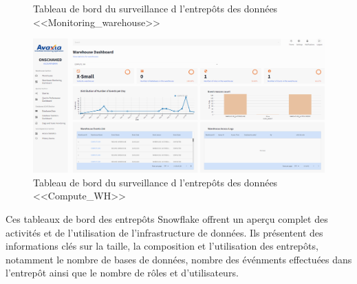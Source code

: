 \begin{itemize}
\begin{figure}[H]
                    \caption{Tableau de bord du surveillance d l'entrepôts des données <<Monitoring\_warehouse>>}
                        \label{fig:warehouse2}
                \end{figure}
                \begin{figure}[H]
                    \centering
                    \includegraphics[width =1\linewidth]{img/captures/warehouse/compute.png}
                    \caption{Tableau de bord du surveillance d l'entrepôts des données <<Compute\_WH>>}
                        \label{fig:warehouse3}
                \end{figure}
                \par Ces tableaux de bord des entrepôts Snowflake offrent un aperçu complet des activités et de l'utilisation de l'infrastructure de données. Ils présentent des informations clés sur la taille, la composition et l'utilisation des entrepôts, notamment le nombre de bases de données, nombre des événments effectuées dans l'entrepôt ainsi que le nombre de rôles et d'utilisateurs.
                

\end{itemize}
